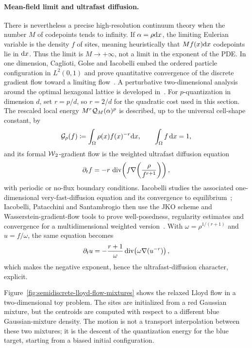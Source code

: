 \paragraph{Mean-field limit and ultrafast diffusion.}
There is nevertheless a precise high-resolution continuum theory when the number \(M\) of codepoints tends to infinity. If \(\alpha=\rho\mathrm{d} x\), the limiting Eulerian variable is the density \(f\) of sites, meaning heuristically that \(M f(x)\mathrm{d} x\) codepoints lie in \(\mathrm{d} x\). Thus the limit is \(M\to+\infty\), not a limit in the exponent of the PDE. In one dimension, Caglioti, Golse and Iacobelli embed the ordered particle configuration in \(L^2(0,1)\) and prove quantitative convergence of the discrete gradient flow toward a limiting flow~\cite{caglioti2015gradient}. A perturbative two-dimensional analysis around the optimal hexagonal lattice is developed in~\cite{caglioti2018quantization2d}. For \(p\)-quantization in dimension \(d\), set \(r=p/d\), so \(r=2/d\) for the quadratic cost used in this section. The rescaled local energy \(M^r\mathcal{Q}_M(\alpha)^p\) is described, up to the universal cell-shape constant, by
\[
	\mathcal{G}_\rho(f)
	\coloneqq
	\int_\Omega \rho(x) f(x)^{-r}\mathrm{d} x,
	\qquad
	\int_\Omega f\,\mathrm{d} x=1,
\]
and its formal \(\operatorname{\mathcal{W}}_2\)-gradient flow is the weighted ultrafast diffusion equation
\[
	\partial_t f
	=
	-r\,\operatorname{div}\!\left(
	f\nabla\!\left(\frac{\rho}{f^{r+1}}\right)
	\right),
\]
with periodic or no-flux boundary conditions. Iacobelli studies the associated one-dimensional very-fast-diffusion equation and its convergence to equilibrium~\cite{iacobelli2019asymptotic}; Iacobelli, Patacchini and Santambrogio then use the JKO scheme and Wasserstein-gradient-flow tools to prove well-posedness, regularity estimates and convergence for a multidimensional weighted version~\cite{iacobelli2019weighted}. With \(\omega=\rho^{1/(r+1)}\) and \(u=f/\omega\), the same equation becomes
\[
	\partial_t u
	=
	-\frac{r+1}{\omega}\operatorname{div}\!\left(\omega\nabla(u^{-r})\right),
\]
which makes the negative exponent, hence the ultrafast-diffusion character, explicit.

Figure~\ref{fig:semidiscrete-lloyd-flow-mixtures} shows the relaxed Lloyd flow in a two-dimensional toy problem. The sites are initialized from a red Gaussian mixture, but the centroids are computed with respect to a different blue Gaussian-mixture density. The motion is not a transport interpolation between these two mixtures; it is the descent of the quantization energy for the blue target, starting from a biased initial configuration.

